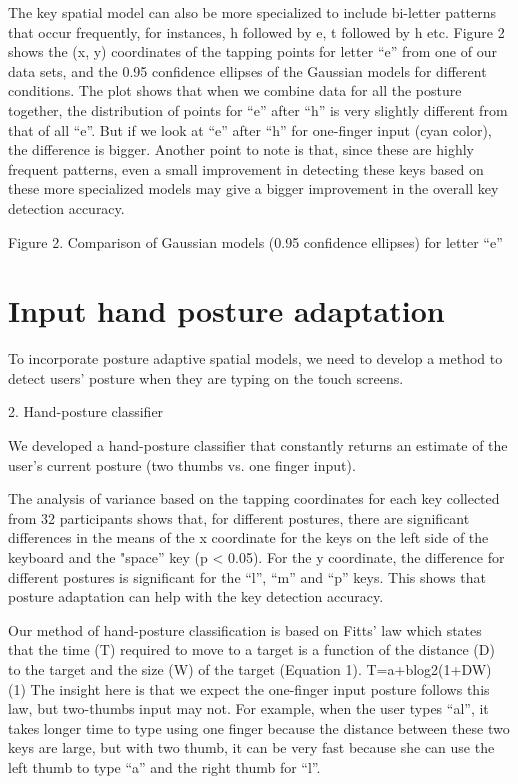 \documentclass{sigchi}
\begin{document}
The key spatial model can also be more specialized to include bi-letter patterns that occur frequently, for instances, h followed by e, t followed by h etc. Figure 2 shows the (x, y) coordinates of the tapping points for letter “e” from one of our data sets, and the 0.95 confidence ellipses of the Gaussian models for different conditions. The plot shows that when we combine data for all the posture together, the distribution of points for “e” after “h” is very slightly different from that of all “e”. But if we look at “e” after “h” for one-finger input (cyan color), the difference is bigger. Another point to note is that, since these are highly frequent patterns, even a small improvement in detecting these keys based on these more specialized models may give a bigger improvement in the overall key detection accuracy. 


Figure 2. Comparison of Gaussian models (0.95 confidence ellipses) for letter “e”

\section{Input hand posture adaptation}
To incorporate posture adaptive spatial models, we need to develop a method to
detect users' posture when they are typing on the touch screens. 

2. Hand-posture classifier

We developed a hand-posture classifier that constantly returns an estimate of the user’s current posture (two thumbs vs. one finger input).

The analysis of variance based on the tapping coordinates for each key collected from 32 participants shows that, for different postures, there are significant differences in the means of the x coordinate for the keys on the left side of the keyboard and the "space” key (p < 0.05). For the y coordinate, the difference for different postures is significant for the “l”, “m” and “p” keys. This shows that posture adaptation can help with the key detection accuracy.

Our method of hand-posture classification is based on Fitts’ law which states that the time (T) required to move to a target is a function of the distance (D) to the target and the size (W) of the target (Equation 1).
T=a+blog2(1+DW)                                                  (1)
The insight here is that we expect the one-finger input posture follows this law,  but two-thumbs input may not. For example, when the user types “al”, it takes longer time to type using one finger because the distance between these two keys are large, but with two thumb, it can be very fast because she can use the left thumb to type “a” and the right thumb for “l”.
\end{document}
